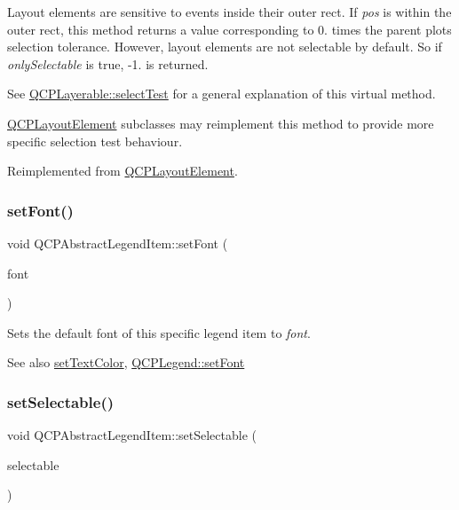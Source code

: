 Layout elements are sensitive to events inside their outer rect. If {\itshape pos} is within the outer rect, this method returns a value corresponding to 0. times the parent plot\textquotesingle{}s selection tolerance. However, layout elements are not selectable by default. So if {\itshape only\+Selectable} is true, -\/1. is returned.

See \hyperlink{classQCPLayerable_a04db8351fefd44cfdb77958e75c6288e}{Q\+C\+P\+Layerable\+::select\+Test} for a general explanation of this virtual method.

\hyperlink{classQCPLayoutElement}{Q\+C\+P\+Layout\+Element} subclasses may reimplement this method to provide more specific selection test behaviour. 

Reimplemented from \hyperlink{classQCPLayoutElement_ae97f483cccedadbf18ea4525ef240ee4}{Q\+C\+P\+Layout\+Element}.

\mbox{\label{classQCPAbstractLegendItem_a409c53455d8112f71d70c0c43eb10265}} 
\subsubsection{\texorpdfstring{set\+Font()}{setFont()}}
{\footnotesize\ttfamily void Q\+C\+P\+Abstract\+Legend\+Item\+::set\+Font (\begin{DoxyParamCaption}\item[{const Q\+Font \&}]{font }\end{DoxyParamCaption})}

Sets the default font of this specific legend item to {\itshape font}.

\begin{DoxySeeAlso}{See also}
\hyperlink{classQCPAbstractLegendItem_a6ebace6aaffaedcdab2d74e88acc2d1e}{set\+Text\+Color}, \hyperlink{classQCPLegend_aa4cda8499e3cb0f3be415edc02984c73}{Q\+C\+P\+Legend\+::set\+Font} 
\end{DoxySeeAlso}
\mbox{\label{classQCPAbstractLegendItem_a9913ef48730551b696e7f98a2391c599}} 
\subsubsection{\texorpdfstring{set\+Selectable()}{setSelectable()}}
{\footnotesize\ttfamily void Q\+C\+P\+Abstract\+Legend\+Item\+::set\+Selectable (\begin{DoxyParamCaption}\item[{bool}]{selectable }\end{DoxyParamCaption})}

